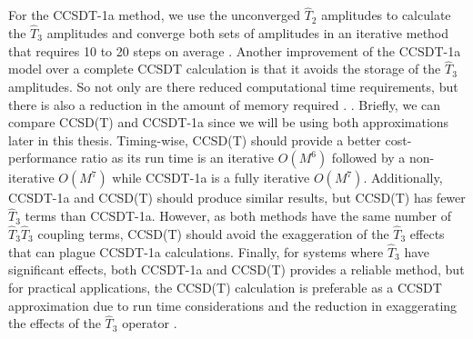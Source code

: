     For the CCSDT-1a method, we use the unconverged $\hat{T}_2$ amplitudes to calculate the $\hat{T}_3$ amplitudes and converge both sets of amplitudes in an iterative method that requires 10 to 20 steps on average \cite{Ref21}. Another improvement of the CCSDT-1a model over a complete CCSDT calculation is that it avoids the storage of the $\hat{T}_3$ amplitudes. So not only are there reduced computational time requirements, but there is also a reduction in the amount of memory required \cite{Ref21,Ref155}.
.
    Briefly, we can compare CCSD(T) and CCSDT-1a since we will be using both approximations later in this thesis. Timing-wise, CCSD(T) should provide a better cost-performance ratio as its run time is an iterative $O(M^6)$ followed by a non-iterative $O(M^7)$ while CCSDT-1a is a fully iterative $O(M^7)$. Additionally, CCSDT-1a and CCSD(T) should produce similar results, but CCSD(T) has fewer $\hat{T}_3$ terms than CCSDT-1a. However, as both methods have the same number of $\hat{T}_3\hat{T}_3$ coupling terms, CCSD(T) should avoid the exaggeration of the $\hat{T}_3$ effects that can plague CCSDT-1a calculations. Finally, for systems where $\hat{T}_3$ have significant effects, both CCSDT-1a and CCSD(T) provides a reliable method, but for practical applications, the CCSD(T) calculation is preferable as a CCSDT approximation due to run time considerations and the reduction in exaggerating the effects of the $\hat{T}_3$ operator \cite{Ref155}.



